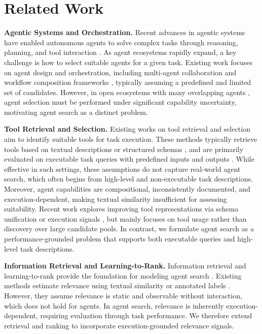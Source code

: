 \documentclass{article} %
\begin{document}
\section{Related Work}
\textbf{Agentic Systems and Orchestration. } Recent advances in agentic systems have enabled autonomous agents to solve complex tasks through reasoning, planning, and tool interaction \citep{DBLP:journals/corr/abs-2402-02716, DBLP:journals/corr/abs-2504-19678, DBLP:journals/csur/QinHLCDCZZHXHFSWQTZLSXZ25}. As agent ecosystems rapidly expand, a key challenge is how to select suitable agents for a given task. Existing work focuses on agent design and orchestration, including multi-agent collaboration \citep{DBLP:journals/corr/abs-2411-04468, hu2025owl} and workflow composition frameworks \citep{yue-etal-2025-masrouter, DBLP:conf/iclr/ShangLZMLXL25, yuan2025automated}, typically assuming a predefined and limited set of candidates. However, in open ecosystems with many overlapping agents \citep{yuan2025easytool, wu2025joint, zhang2025routerr}, agent selection must be performed under significant capability uncertainty, motivating agent search as a distinct problem.

\textbf{Tool Retrieval and Selection. } Existing works on tool retrieval and selection \citep{DBLP:conf/iclr/QinLYZYLLCTQZHT24, shi2025retrieval} aim to identify suitable tools for task execution. These methods typically retrieve tools based on textual descriptions or structured schemas \citep{DBLP:journals/corr/abs-2602-05366, lu2025tools, qu2024towards}, and are primarily evaluated on executable task queries with predefined inputs and outputs \citep{DBLP:conf/iclr/QinLYZYLLCTQZHT24, qu2024towards}. While effective in such settings, these assumptions do not capture real-world agent search, which often begins from high-level and non-executable task descriptions. Moreover, agent capabilities are compositional, inconsistently documented, and execution-dependent, making textual similarity insufficient for assessing suitability. Recent work explores improving tool representations via schema unification or execution signals \citep{yuan2025easytool, DBLP:conf/iclr/QuDWCWY0W25, wu2025joint}, but mainly focuses on tool usage rather than discovery over large candidate pools. In contrast, we formulate agent search as a performance-grounded problem that supports both executable queries and high-level task descriptions.

\textbf{Information Retrieval and Learning-to-Rank. } Information retrieval and learning-to-rank provide the foundation for modeling agent search \citep{robertson2009probabilistic, behnamghader2024llm2vec}. Existing methods estimate relevance using textual similarity or annotated labels \citep{craswell2021ms, craswell2025overview}. However, they assume relevance is static and observable without interaction, which does not hold for agents. In agent search, relevance is inherently execution-dependent, requiring evaluation through task performance. We therefore extend retrieval and ranking to incorporate execution-grounded relevance signals.
\end{document}
